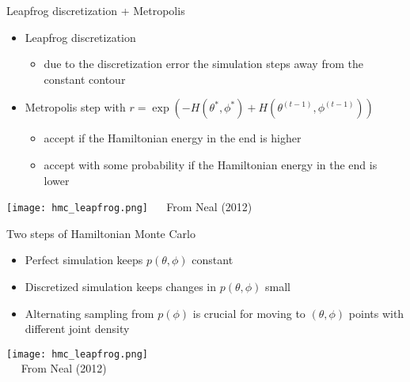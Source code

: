 \documentclass[finnish,english,t]{beamer}
\begin{document}
\begin{frame}{Leapfrog discretization + Metropolis}

  \vspace{-0.5\baselineskip}
  \begin{itemize}
  \item Leapfrog discretization
    \begin{itemize}
    \item due to the discretization error the simulation steps away
      from the constant contour
    \end{itemize}
  \item<2-> Metropolis step with
    $r=\exp\left(-H(\theta^*,\phi^*)+H(\theta^{(t-1)},\phi^{(t-1)})\right)$
    \begin{itemize}
    \item accept if the Hamiltonian energy in the end is higher 
    \item accept with some probability if the Hamiltonian energy in
      the end is lower
    \end{itemize}
  \end{itemize}
    \vspace{-0.6\baselineskip}
    \begin{center}
      \texttt{[image: hmc\_leapfrog.png]}
      {\footnotesize~~ From Neal (2012)}
    \end{center}
\end{frame}

\begin{frame}{Two steps of Hamiltonian Monte Carlo}

  \vspace{-0.6\baselineskip}
  \begin{itemize}
  \item Perfect simulation keeps $p(\theta,\phi)$ constant
  \item<2-> Discretized simulation keeps changes in
    $p(\theta,\phi)$ small
  \item<3-> Alternating sampling from $p(\phi)$ is crucial for moving
    to $(\theta,\phi)$ points with different joint density
  \end{itemize}
  
  \texttt{[image: hmc\_leapfrog.png]}\\
      {\footnotesize~~ From Neal (2012)}

\end{frame}
\end{document}
